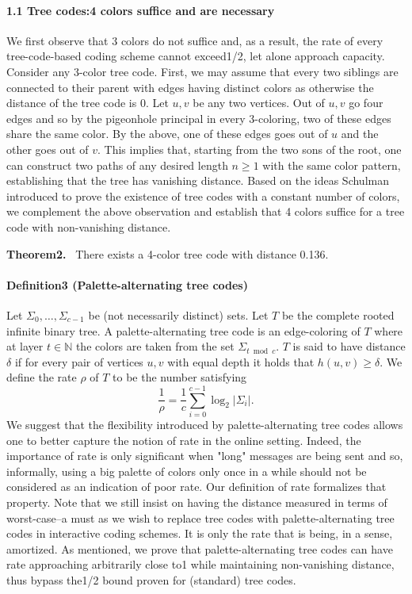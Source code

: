 \documentclass[10pt,a4paper]{article}
\newenvironment{authorclaim}[1]{\par\medskip\noindent\textbf{#1.}\ \ignorespaces}{\par\medskip}
\begin{document}
\paragraph{1.1 Tree codes:4 colors suffice and are necessary}
We first observe that 3 colors do not suffice and, as a result, the rate of every tree-code-based coding scheme cannot exceed1/2, let alone approach capacity. Consider any 3-color tree code. First, we may assume that every two siblings are connected to their parent with edges having distinct colors as otherwise the distance of the tree code is 0. Let $u,v$ be any two vertices. Out of $u,v$ go four edges and so by the pigeonhole principal in every 3-coloring, two of these edges share the same color. By the above, one of these edges goes out of $u$ and the other goes out of $v$. This implies that, starting from the two sons of the root, one can construct two paths of any desired length $n\ge1$ with the same color pattern, establishing that the tree has vanishing distance.
Based on the ideas Schulman introduced to prove the existence of tree codes with a constant number of colors, we complement the above observation and establish that 4 colors suffice for a tree code with non-vanishing distance.
\begin{authorclaim}{Theorem2}
There exists a 4-color tree code with distance 0.136.
\end{authorclaim}
\paragraph{Definition3 (Palette-alternating tree codes)}
Let $\Sigma_0,\ldots,\Sigma_{c-1}$ be (not necessarily distinct) sets. Let $T$ be the complete rooted infinite binary tree. A palette-alternating tree code is an edge-coloring of $T$ where at layer $t\in\mathbb N$ the colors are taken from the set $\Sigma_{t\bmod c}$. $T$ is said to have distance $\delta$ if for every pair of vertices $u,v$ with equal depth it holds that $h(u,v)\ge\delta$. We define the rate $\rho$ of $T$ to be the number satisfying
\[
\frac1\rho=\frac1c\sum_{i=0}^{c-1}\log_2|\Sigma_i|.
\]
We suggest that the flexibility introduced by palette-alternating tree codes allows one to better capture the notion of rate in the online setting. Indeed, the importance of rate is only significant when "long" messages are being sent and so, informally, using a big palette of colors only once in a while should not be considered as an indication of poor rate. Our definition of rate formalizes that property. Note that we still insist on having the distance measured in terms of worst-case--a must as we wish to replace tree codes with palette-alternating tree codes in interactive coding schemes. It is only the rate that is being, in a sense, amortized.
As mentioned, we prove that palette-alternating tree codes can have rate approaching arbitrarily close to1 while maintaining non-vanishing distance, thus bypass the1/2 bound proven for (standard) tree codes.
\end{document}
